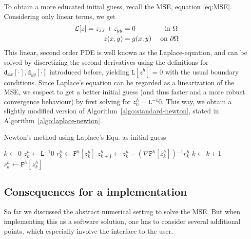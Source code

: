 \documentclass[11pt]{scrartcl}
\newcommand{\mSurfDisc}[1]{\ensuremath{\mathtt{F}^h\left[#1\right]}}
\newcommand{\Dxx}[1]{\ensuremath{\mathtt{d}_{xx}[#1]}}
\newcommand{\Dyy}[1]{\ensuremath{\mathtt{d}_{yy}[#1]}}
\newcommand{\inv}{\ensuremath{^{-1}}}
\begin{document}
To obtain a more educated initial guess, recall the MSE, equation \eqref{eq:MSE}. Considering only linear terms, we get 
\begin{align}
	\mathcal{L} [z] = z_{xx} + z_{yy} &= 0 \quad\quad\quad\quad \text{ in } \Omega \\
	z(x,y) &= g(x,y) \quad \text{ on } \partial\Omega \notag 
\end{align}\newpage
This linear, second order PDE is well known as the Laplace-equation, and can be solved by discretizing the second derivatives using the definitions for $\Dxx{\cdot},\Dyy{\cdot}$ introduced before, yielding $\mathtt{L}[z^h]=0 $ with the usual boundary conditions. Since Laplace's equation can be regarded as a linearization of the MSE, we suspect to get a better initial guess (and thus faster and a more robust convergence behaviour) by first solving for $z^h_0= \mathtt{L}\inv 0$. This way, we obtain a slightly modified version of Algorithm~\ref{algo:standard-newton}, stated in Algorithm~\ref{algo:laplace-newton}.

\begin{algorithm}
	\caption{Newton's method using Laplace's Equ. as initial guess}\label{algo:laplace-newton}
	\begin{algorithmic}
		\State $k \gets 0$ 
		\State $z^h_k \gets \mathtt{L}\inv 0 $ 
		\State $r^h_k \gets \mSurfDisc{z^h_k}$
		\State $z^h_{k+1} \gets z^h_{k} - \left(\nabla\mSurfDisc{z^h_k}\right)\inv r^h_k $
		\State $k \gets k+1$ 
		\State $r^h_k \gets \mSurfDisc{z^h_k}$
		\EndWhile
	\end{algorithmic}
\end{algorithm}

\subsection{Consequences for a implementation}
So far we discussed the abstract numerical setting to solve the MSE. But when implementing this as a software solution, one has to consider several additional points, which especially involve the interface to the user.
\end{document}
